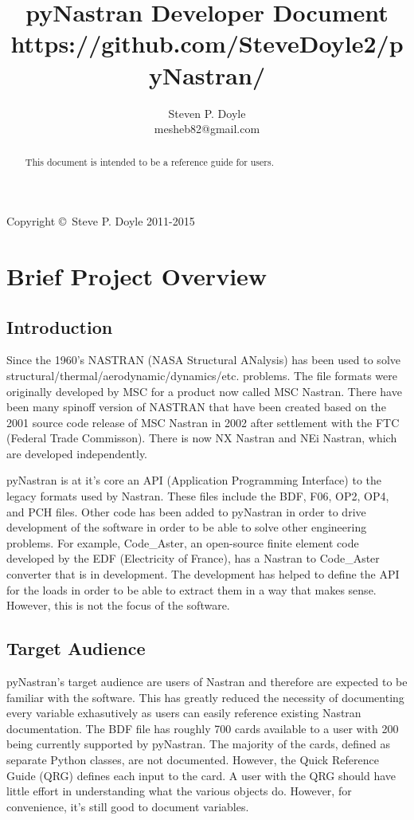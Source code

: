 
\title{pyNastran Developer Document \\
\small https://github.com/SteveDoyle2/pyNastran/ }
\author{Steven P. Doyle\\
{\small mesheb82@gmail.com}
}

\maketitle

\begin{abstract}
This document is intended to be a reference guide for users.
\end{abstract}

Copyright \copyright\ Steve P. Doyle 2011-2015
\newpage

\tableofcontents
\newpage

\section{Brief Project Overview}
  \subsection{Introduction}
      Since the 1960's NASTRAN (NASA Structural ANalysis) has been used to solve structural/thermal/aerodynamic/dynamics/etc. problems.  The file formats were originally developed by MSC for a product now called MSC Nastran.  There have been many spinoff version of NASTRAN that have been created based on the 2001 source code release of MSC Nastran in 2002 after settlement with the FTC (Federal Trade Commisson).  There is now NX Nastran and NEi Nastran, which are developed independently.

     pyNastran is at it's core an API (Application Programming Interface) to the legacy formats used by Nastran.  These files include the BDF, F06, OP2, OP4, and PCH files.  Other code has been added to pyNastran in order to drive development of the software in order to be able to solve other engineering problems.  For example, Code\_Aster, an open-source finite element code developed by the EDF (Electricity of France), has a Nastran to Code\_Aster converter that is in development.  The development has helped to define the API for the loads in order to be able to extract them in a way that makes sense.  However, this is not the focus of the software.

  \subsection{Target Audience}
      pyNastran's target audience are users of Nastran and therefore are expected to be familiar with the software.  This has greatly reduced the necessity of documenting every variable exhasutively as users can easily reference existing Nastran documentation. The BDF file has roughly 700 cards available to a user with 200 being currently supported by pyNastran.  The majority of the cards, defined as separate Python classes, are not documented.  However, the Quick Reference Guide (QRG) defines each input to the card.  A user with the QRG should have little effort in understanding what the various objects do.  However, for convenience, it's still good to document variables.

